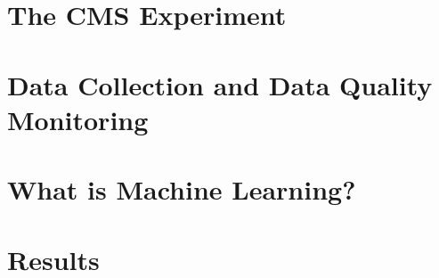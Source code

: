 \documentclass[12pt,twoside,openany]{book}
\begin{document}
\chapter{The CMS Experiment\label{LHCCMS}}


\chapter{Data Collection and Data Quality Monitoring \label{DQMchapter} }


\chapter{What is Machine Learning?\label{ML}}


\chapter{Results \label{ch:results}}


%


\appendix
\nocite{*}


\end{document}
